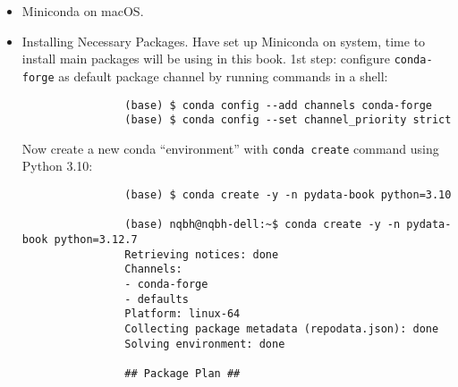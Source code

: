 \documentclass{article}
\newtheorem{remark}{Remark}
\begin{document}
\begin{itemize}
\begin{itemize}
\begin{itemize}
			\begin{remark}
				Some Linux distributions have all required Python packages (although outdated versions, in some cases) in their package managers \& can be installed using a tool like {\tt apt}. Setup described here uses Miniconda, as it's both easily reproducible across distributions \& simpler to upgrade packages to their latest versions.
			\end{remark}
			Will have a choice of where to put Miniconda files. Recommend installing files in default location in home directory; e.g., \verb|/home/$USER/miniconda| (with your username, naturally).
			
			Installer will ask if wish to modify shell scripts to automatically activate Miniconda. Recommend doing this (select ``yes'') as a matter of convenience.
			
			After completing installation, start a new terminal process \& verify that you are picking up new Miniconda installation:
			\begin{verbatim}
				(base) nqbh@nqbh-dell:~/advanced_STEM_beyond/data_science$ python
				Python 3.12.7 | packaged by Anaconda, Inc. | (main, Oct  4 2024, 13:27:36) [GCC 11.2.0] on linux
				Type "help", "copyright", "credits" or "license" for more information.
				>>>
			\end{verbatim}
			To exit Python shell, type {\tt exit()} \& press Enter or press Ctrl-D.
			\item {\sf Miniconda on macOS.}
			\item {\sf Installing Necessary Packages.} Have set up Miniconda on system, time to install main packages will be using in this book. 1st step: configure {\tt conda-forge} as default package channel by running commands in a shell:
			\begin{verbatim}
				(base) $ conda config --add channels conda-forge
				(base) $ conda config --set channel_priority strict
			\end{verbatim}
			Now create a new conda ``environment'' with {\tt conda create} command using Python 3.10:
			\begin{verbatim}
				(base) $ conda create -y -n pydata-book python=3.10
				
				(base) nqbh@nqbh-dell:~$ conda create -y -n pydata-book python=3.12.7
				Retrieving notices: done
				Channels:
				- conda-forge
				- defaults
				Platform: linux-64
				Collecting package metadata (repodata.json): done
				Solving environment: done
				
				## Package Plan ##
				

\end{verbatim}
\end{itemize}
\end{itemize}
\end{itemize}
\end{document}
